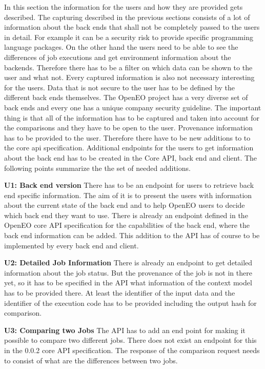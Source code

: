 \documentclass[draft,final]{vutinfth} %
\begin{document}
In this section the information for the users and how they are provided gets described. The capturing described in the previous sections consists of a lot of  information about the back ends that shall not be completely passed to the users in detail. For example it can be a security risk to provide specific programming language packages. On the other hand the users need to be able to see the differences of job executions and get environment information about the backends. Therefore there has to be a filter on which data can be shown to the user and what not. Every captured information is also not necessary interesting for the users. Data that is not secure to the user has to be defined by the different back ends themselves. The OpenEO project has a very diverse set of back ends and every one has a unique company security guideline. The important thing is that all of the information has to be captured and taken into account for the comparisons and they have to be open to the user.
Provenance information has to be provided to the user. Therefore there have to be new additions to to the core api specification. Additional endpoints for the users to get information about the back end has to be created in the Core API, back end and client. The following points summarize the the set of needed additions. 

\textbf{U1: Back end version}
There has to be an endpoint for users to retrieve back end specific information. The aim of it is to present the users with information about the current state of the back end and to help OpenEO users to decide which back end they want to use. There is already an endpoint defined in the OpenEO core API specification for the capabilities of the back end, where the back end information can be added. This addition to the API has of course to be implemented by every back end and client.

\textbf{U2: Detailed Job Information}
There is already an endpoint to get detailed information about the job status. But the provenance of the job is not in there yet, so it has to be specified in the API what information of the context model has to be provided there. At least the identifier of the input data and the identifier of the execution code has to be provided including the output hash for comparison.   

\textbf{U3: Comparing two Jobs}
The API has to add an end point for making it possible to compare two different jobs. There does not exist an endpoint for this in the 0.0.2 core API specification. The response of the comparison request needs to consist of what are the differences between two jobs. 
\end{document}
